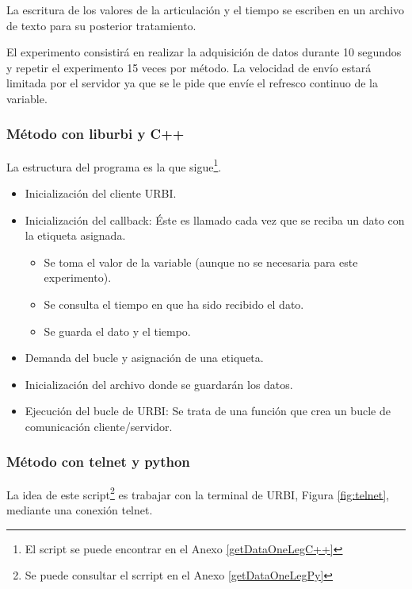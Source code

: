 \documentclass[12pt,a4paper,final,twoside]{book}
\begin{document}
La escritura de los valores de la articulación y el tiempo se escriben en un archivo de texto para su posterior tratamiento.

El experimento consistirá en realizar la adquisición de datos durante 10 segundos y repetir el experimento 15 veces por método. La velocidad de envío estará limitada por el servidor ya que se le pide que envíe el refresco continuo de la variable.

\subsubsection{Método con liburbi y C++}

La estructura del programa es la que sigue\footnote{El script se puede encontrar en el Anexo \ref{getDataOneLegC++}}. 

\begin{itemize}
\item Inicialización del cliente URBI.
\item Inicialización del callback: Éste es llamado cada vez que se reciba un dato con la etiqueta asignada. 
\begin{itemize}
\item Se toma el valor de la variable (aunque no se necesaria para este experimento).
\item Se consulta el tiempo en que ha sido recibido el dato.
\item Se guarda el dato y el tiempo.
\end{itemize}
\item Demanda del bucle y asignación de una etiqueta.
\item Inicialización del archivo donde se guardarán los datos.
\item Ejecución del bucle de URBI: Se trata de una función que crea un bucle de comunicación cliente/servidor. 
\end{itemize}

\subsubsection{Método con telnet y python}
La idea de este script\footnote{Se puede consultar el scrript en el Anexo \ref{getDataOneLegPy}} es trabajar con la terminal de URBI, Figura \ref{fig:telnet},  mediante una conexión telnet.
\end{document}
